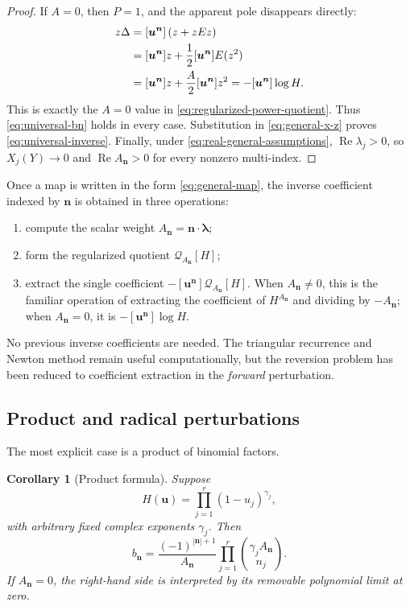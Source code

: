 \documentclass[11pt,oneside]{article}
\theoremstyle{plain}
\newtheorem{corollary}[theorem]{Corollary}
\theoremstyle{definition}
\theoremstyle{remark}
\newcommand{\abs}[1]{\left\lvert#1\right\rvert}
\newcommand{\Real}{\operatorname{Re}}
\begin{document}
\begin{proof}
If \(A=0\), then \(P=1\), and the apparent pole disappears directly:
\begin{align}
 [\bm u^{\bm n}]z\Delta
 &=[\bm u^{\bm n}]\left(z+zEz\right)\notag\\
 &=[\bm u^{\bm n}]z
 +\frac12[\bm u^{\bm n}]E(z^2)\notag\\
 &=[\bm u^{\bm n}]z
 +\frac{A}{2}[\bm u^{\bm n}]z^2
 =-[\bm u^{\bm n}]\log H.
 \label{eq:zero-A-cancellation}
\end{align}
This is exactly the \(A=0\) value in
\eqref{eq:regularized-power-quotient}.  Thus
\eqref{eq:universal-bn} holds in every case.  Substitution in
\eqref{eq:general-x-z} proves \eqref{eq:universal-inverse}.  Finally, under
\eqref{eq:real-general-assumptions}, \(\Real\lambda_j>0\), so
\(X_j(Y)\to0\) and \(\Real A_{\bm n}>0\) for every nonzero multi-index.
\end{proof}

\begin{methodbox}[title={One coefficient extraction replaces reversion}]
Once a map is written in the form \eqref{eq:general-map}, the inverse
coefficient indexed by \(\bm n\) is obtained in three operations:
\begin{enumerate}
\item compute the scalar weight \(A_{\bm n}=\bm n\cdot\bm\lambda\);
\item form the regularized quotient \(\mathscr Q_{A_{\bm n}}[H]\);
\item extract the single coefficient
\(-[\bm u^{\bm n}]\mathscr Q_{A_{\bm n}}[H]\).  When
\(A_{\bm n}\ne0\), this is the familiar operation of extracting the
coefficient of \(H^{A_{\bm n}}\) and dividing by \(-A_{\bm n}\); when
\(A_{\bm n}=0\), it is \(-[\bm u^{\bm n}]\log H\).
\end{enumerate}
No previous inverse coefficients are needed.  The triangular recurrence and
Newton method remain useful computationally, but the reversion problem has
been reduced to coefficient extraction in the \emph{forward} perturbation.
\end{methodbox}

\subsection{Product and radical perturbations}

The most explicit case is a product of binomial factors.

\begin{corollary}[Product formula]
\label{cor:product-formula}
Suppose
\begin{equation}
 H(\bm u)=\prod_{j=1}^r(1-u_j)^{\gamma_j},
 \label{eq:H-product}
\end{equation}
with arbitrary fixed complex exponents \(\gamma_j\).  Then
\begin{equation}
 \boxed{
 b_{\bm n}=
 \frac{(-1)^{\abs{\bm n}+1}}{A_{\bm n}}
 \prod_{j=1}^r
 \binom{\gamma_jA_{\bm n}}{n_j}.}
 \label{eq:product-bn}
\end{equation}
If \(A_{\bm n}=0\), the right-hand side is interpreted by its removable
polynomial limit at zero.
\end{corollary}
\end{document}
